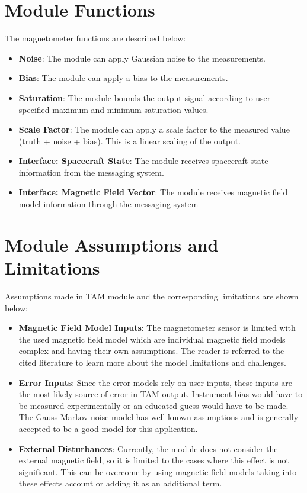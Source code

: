 

\section{Module Functions}
The magnetometer functions are described below:
\begin{itemize}
	\item \textbf{Noise}: The module can apply Gaussian noise to the measurements.
	\item \textbf{Bias}: The module can apply a bias to the measurements.
	\item \textbf{Saturation}: The module bounds the output signal according to user-specified maximum and minimum saturation values.
    \item \textbf{Scale Factor}: The module can apply a scale factor to the measured value (truth + noise + bias). This is a linear scaling of the output.
	\item \textbf{Interface: Spacecraft State}: The module receives spacecraft state information from the messaging system.
	\item \textbf{Interface: Magnetic Field Vector}: The module receives magnetic field model information through the messaging system
\end{itemize}

\section{Module Assumptions and Limitations}
Assumptions made in TAM module and the corresponding limitations are shown below:
\begin{itemize}
    \item \textbf{Magnetic Field Model Inputs}: The magnetometer sensor is limited with the used magnetic field model which are individual magnetic field models complex and having their own assumptions. The reader is referred to the cited literature to learn more about the model limitations and challenges.
	\item \textbf{Error Inputs}: Since the error models rely on user inputs, these inputs are the most likely source of error in TAM output. Instrument bias would have to be measured experimentally or an educated guess would have to be made. The Gauss-Markov noise model has well-known assumptions and is generally accepted to be a good model for this application.
	\item \textbf{External Disturbances}: Currently, the module does not consider the external magnetic field, so it is limited to the cases where this effect is not significant. This can be overcome by using magnetic field models taking into these effects account or adding it as an additional term.
\end{itemize}